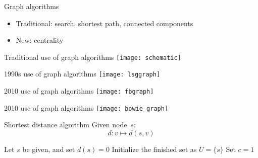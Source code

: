 
\begin{numberedframe}{Graph algorithms}
  \begin{itemize}
  \item Traditional: search, shortest path, connected components
  \item New: centrality
  \end{itemize}
\end{numberedframe}

\begin{numberedframe}{Traditional use of graph algorithms}
  \texttt{[image: schematic]}
\end{numberedframe}

\begin{numberedframe}{1990s use of graph algorithms}
  \texttt{[image: lsggraph]}
\end{numberedframe}

\begin{numberedframe}{2010 use of graph algorithms}
  \texttt{[image: fbgraph]}
\end{numberedframe}

\begin{numberedframe}{2010 use of graph algorithms}
  \texttt{[image: bowie\_graph]}
\end{numberedframe}

\begin{numberedframe}{Shortest distance algorithm}
  Given node~$s$:
  \[ d\colon v\mapsto d(s,v) \]
\begin{displayalgorithm}
  Let $s$ be given, and set $d(s)=0$\;
  Initialize the finished set as $U=\{s\}$\;
  Set $c=1$\;
\end{displayalgorithm}
\end{numberedframe}

